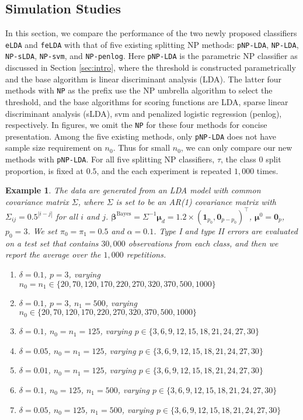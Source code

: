 \documentclass[12pt]{article}
\numberwithin{equation}{section}
\newtheorem{example}{Example}
\theoremstyle{remark}
\newcommand{\1}{{\rm 1}\kern-0.24em{\rm I}}
\begin{document}
\subsection{Simulation Studies}
In this section, we compare the performance of the two newly proposed classifiers \verb+eLDA+ and \verb+feLDA+ with that of five existing splitting NP methods: \verb+pNP-LDA+, \verb+NP-LDA+, \verb+NP-sLDA+, \verb+NP-svm+, and \verb+NP-penlog+. Here \verb+pNP-LDA+ is the parametric NP classifier as discussed in Section \ref{sec:intro}, where the threshold is constructed parametrically and the base algorithm is linear discriminant analysis (LDA). The latter four methods with \verb+NP+ as the prefix use the NP umbrella algorithm to select the threshold, and the base algorithms for scoring functions are LDA, sparse linear discriminant analysis (sLDA), svm and penalized logistic regression (penlog), respectively. In figures,  we omit the \verb+NP+ for these four methods for concise presentation.  Among the five existing methods, only \verb+pNP-LDA+ does not have sample size requirement on $n_0$. Thus for small $n_0$,  we can only compare our new methods with \verb+pNP-LDA+. For all five splitting NP classifiers, $\tau$, the class $0$ split proportion, is fixed at $0.5$, and the each experiment is repeated $1{,}000$ times. 
\begin{example}
The data are generated from an LDA model with common covariance matrix $\Sigma$, where $\Sigma$ is set to be an AR(1) covariance matrix with $\Sigma_{ij}=0.5^{|i-j|}$ for all $i$ and $j$. $\bm{\beta}^{\text{Bayes}}=\Sigma^{-1} \bm{\mu}_d= 1.2\times(\bm{1}_{p_0}, \bm{0}_{p - p_0})^{\top}$, $\bm{\mu}^0=\bm{0}_p$, $p_0 = 3$. We set $\pi_0 = \pi_1 = 0.5$ and $\alpha=0.1$.  Type I and type II errors are evaluated on a test set that contains $30{,}000$ observations from each class, and then we report the average over the $1{,}000$ repetitions.
\begin{enumerate}
\item[(1a)]    $\delta = 0.1$, $p = 3$, varying $n_0 = n_1 \in \{20, 70, 120, 170, 220, 270, 320, 370,500,1000\}$
  \item[(1b)] $\delta = 0.1$, $p = 3$, $n_1 = 500$,  varying $n_0 \in \{20, 70, 120, 170, 220, 270, 320, 370,500,1000\}$
  \item[(1c)] $\delta = 0.1$,  $n_0 = n_1 = 125$, varying $p \in \{3,6,9,12,15,18,21,24,27,30\}$
  \item[(1c')] $\delta = 0.05$, $n_0 = n_1 = 125$, varying $p \in \{3,6,9,12,15,18,21,24,27,30\}$
   \item[(1c*)] $\delta = 0.01$, $n_0 = n_1 = 125$, varying $p \in \{3,6,9,12,15,18,21,24,27,30\}$
  \item[(1d)]  $\delta = 0.1$, $n_0 = 125$, $n_1 = 500$, varying $p \in \{3,6,9,12,15,18,21,24,27,30\}$
  \item[(1d')] $\delta = 0.05$, $n_0 = 125$, $n_1 = 500$, varying $p \in \{3,6,9,12,15,18,21,24,27,30\}$
\end{enumerate}
\end{example}
\end{document}
